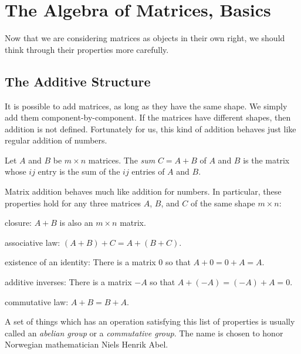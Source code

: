 \documentclass[elementsmain.tex]{subfiles}
\begin{document}
\section{The Algebra of Matrices, Basics}

Now that we are considering matrices as objects in their own right, we should think through their properties more carefully.

\subsection*{The Additive Structure}

It is possible to add matrices, as long as they have the same shape. We simply add them component-by-component. If the matrices have different shapes, then addition is not defined. Fortunately for us, this kind of addition behaves just like regular addition of numbers.

\begin{definition}
Let $A$ and $B$ be $m\times n$ matrices. The \emph{sum} $C = A+B$ of $A$ and $B$ is the matrix whose $ij$ entry is the sum of the $ij$ entries of $A$ and $B$.
\end{definition}

\begin{theorem}
Matrix addition behaves much like addition for numbers. In particular, these properties hold for any three matrices $A$, $B$, and $C$ of the same shape $m\times n$:
\begin{compactdesc}
\item[closure:] $A+B$ is also an $m\times n$ matrix.
\item[associative law:] $(A+B)+C = A + (B+ C)$.
\item[existence of an identity:] There is a matrix $0$ so that $A+0 = 0+A = A$.
\item[additive inverses:] There is a matrix $-A$ so that $A + (-A) = (-A) + A = 0$.
\item[commutative law:] $A+B = B+A$.
\end{compactdesc}
\end{theorem}

\begin{remark}
A set of things which has an operation satisfying this list of properties is usually called an \emph{abelian group} or a \emph{commutative group}. The name is chosen to honor Norwegian mathematician Niels Henrik Abel.
\end{remark}
\end{document}
